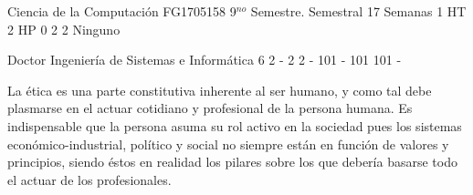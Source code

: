 \documentclass[a4paper,8pt]{article}
\begin{document}
\setNombreProfesor{}
\setGradoProfesorAbreviado{}
\sylabusHeader

\academicaTable
{Ciencia de la Computación} %
{FG1705158} %
{9$^{no}$ Semestre.} %
{Semestral} %
{17 Semanas} %
{1 HT} %
{2 HP} %
{0} %
{}  %
{2} %
{2} %
{Ninguno} %

\administrativaTable
{Doctor} %
{Ingeniería de Sistemas e Informática} %
{6} %
{2} %
{-} %
{2} %
{2} %
{-} %
{101} %
{-} %
{101} %
{101} %
{-} %


\begin{fundamentacion}
La ética es una parte constitutiva inherente al ser humano, y como tal debe plasmarse en el actuar cotidiano y profesional de la persona humana. Es indispensable que la persona asuma su rol activo en la sociedad pues los sistemas económico-industrial, político y social no siempre están en función de valores y principios, siendo éstos en realidad los pilares sobre los que debería basarse todo el actuar de los profesionales.

\end{fundamentacion}

\begin{sumilla}
\item 
\item 
\item 
\item 

\end{sumilla}

\begin{competenciasAsignatura}
\item {}
\item {}
\item {}
\item {}

\end{competenciasAsignatura}
\end{document}
